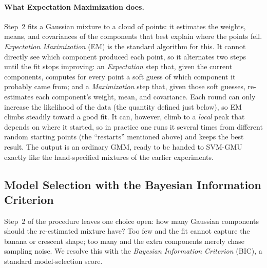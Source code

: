 \documentclass[11pt, letterpaper]{article}
\begin{document}
\paragraph{What Expectation Maximization does.} Step~2 fits a Gaussian mixture to a cloud of points: it estimates the weights, means, and covariances of the components that best explain where the points fell. \emph{Expectation Maximization} (EM) is the standard algorithm for this. It cannot directly see which component produced each point, so it alternates two steps until the fit stops improving: an \emph{Expectation} step that, given the current components, computes for every point a soft guess of which component it probably came from; and a \emph{Maximization} step that, given those soft guesses, re-estimates each component's weight, mean, and covariance. Each round can only increase the likelihood of the data (the quantity defined just below), so EM climbs steadily toward a good fit. It can, however, climb to a \emph{local} peak that depends on where it started, so in practice one runs it several times from different random starting points (the ``restarts'' mentioned above) and keeps the best result. The output is an ordinary GMM, ready to be handed to SVM-GMU exactly like the hand-specified mixtures of the earlier experiments.

\subsection{Model Selection with the Bayesian Information Criterion}\label{sec:exp_em_bic}

Step~2 of the procedure leaves one choice open: how many Gaussian components should the re-estimated mixture have? Too few and the fit cannot capture the banana or crescent shape; too many and the extra components merely chase sampling noise. We resolve this with the \emph{Bayesian Information Criterion} (BIC), a standard model-selection score.
\end{document}
